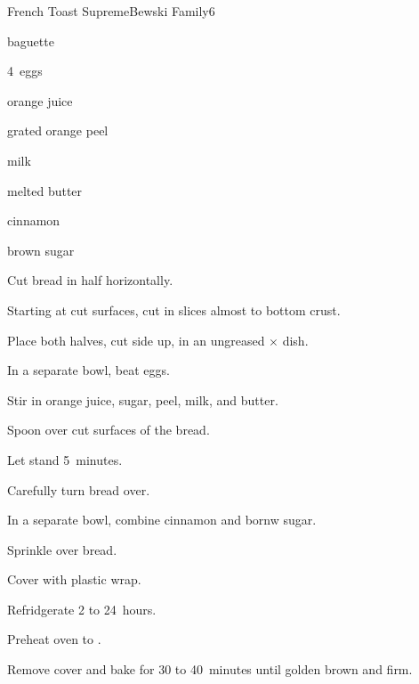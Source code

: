 \begin{recipe}{French Toast Supreme}{Bewski Family}{6}

\begin{ingredients}
\item baguette
\item 4~eggs
\item \C{\third} orange juice
\item \tp{\half} grated orange peel
\item \C{1\quarter} milk
\item {} melted butter
\item \tp{\eighth} cinnamon
\item {} brown sugar
\end{ingredients}

\begin{directions}
\item Cut bread in half horizontally.
\item Starting at cut surfaces, cut in  slices almost to bottom crust.
\item Place both halves, cut side up, in an ungreased $\times$ dish.
\item In a separate bowl, beat eggs.
\item Stir in orange juice, sugar, peel, milk, and butter.
\item Spoon over cut surfaces of the bread.
\item Let stand 5~minutes.
\item Carefully turn bread over.
\item In a separate bowl, combine cinnamon and bornw sugar.
\item Sprinkle over bread.
\item Cover with plastic wrap.
\item Refridgerate 2 to 24~hours.
\item Preheat oven to .
\item Remove cover and bake for 30 to 40~minutes until golden brown and firm.
\end{directions}

\end{recipe}
